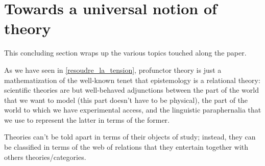 \section{Towards a universal notion of theory}\label{sec_6_universal}
This concluding section wraps up the various topics touched along the paper.

\medskip
As we have seen in \autoref{resoudre_la_tension}, profunctor theory is just a mathematization of the well-known tenet that epistemology is a relational theory: scientific theories are but well-behaved adjunctions between the part of the world that we want to model (this part doesn't have to be physical), the part of the world to which we have experimental access, and the linguistic paraphernalia that we use to represent the latter in terms of the former.

Theories can't be told apart in terms of their objects of study; instead, they can be classified in terms of the web of relations that they entertain together with others theories/categories.

